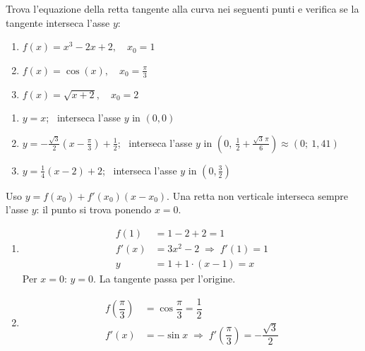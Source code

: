
\begin{question}[ID=2.2, subtitle={Retta tangente con verifica intersezione asse $y$}, tags={derivate, retta tangente}, difficulty=media]
Trova l'equazione della retta tangente alla curva nei seguenti punti e verifica se la tangente interseca l'asse \( y \):
\begin{center}\begin{minipage}{0.85\linewidth}
\begin{enumerate}[label=\arabic*)]
\item $f(x) = x^3 - 2x + 2, \quad x_0 = 1$
\item $f(x) = \cos(x), \quad x_0 = \frac{\pi}{3}$
\item $f(x) = \sqrt{x+2}, \quad x_0 = 2$
\end{enumerate}
\end{minipage}\end{center}
\begin{solution}
\begin{enumerate}[label=\arabic*)]
    \item $y=x$; \ interseca l'asse $y$ in $(0,0)$
    \item $y=-\tfrac{\sqrt3}{2}\left(x-\tfrac{\pi}{3}\right)+\tfrac12$; \ interseca l'asse $y$ in $\left(0,\ \tfrac12+\tfrac{\sqrt3\,\pi}{6}\right)\approx(0;\ 1{,}41)$
    \item $y=\tfrac14(x-2)+2$; \ interseca l'asse $y$ in $\left(0,\tfrac32\right)$
\end{enumerate}
\end{solution}
\begin{explanation}
Uso $y=f(x_0)+f'(x_0)(x-x_0)$. Una retta non verticale interseca sempre l'asse $y$: il punto si trova ponendo $x=0$.
\begin{enumerate}[label=\arabic*)]
    \item \[\begin{aligned}
    f(1) &= 1-2+2=1\\
    f'(x) &= 3x^2-2 \;\Rightarrow\; f'(1)=1\\
    y &= 1+1\cdot(x-1)=x
    \end{aligned}\]
    Per $x=0$: $y=0$. La tangente passa per l'origine.
    \item \[\begin{aligned}
    f\left(\dfrac\pi3\right) &= \cos\dfrac\pi3=\dfrac12\\
    f'(x) &= -\sin x \;\Rightarrow\; f'\left(\dfrac\pi3\right)=-\dfrac{\sqrt3}{2}\\

\end{aligned}\]
\end{enumerate}
\end{explanation}
\end{question}

